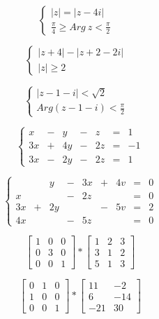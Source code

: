 \documentclass[a4paper]{article}
\begin{document}
\begin{center}
$$\begin{cases}
 \left |  z \right | =  \left |  z-4i \right | & \\ 
 \frac{\pi }{4} \geqslant Arg \ z < \frac{\pi}{2} &  
\end{cases}$$


$$\begin{cases}
 \left |  z+4 \right | -  \left |  z+2-2i \right | & \\ 
 \left | z \right | \geqslant 2 &  
\end{cases}$$

$$\begin{cases}
 \left |  z-1-i \right | < \sqrt{2} & \\ 
 Arg(z-1-i)< \frac{\pi}{2} &  
\end{cases}$$



$$
\left \{
\begin{array}{rrrrrrr}
 x & - & y & - & z &= & 1  \\ 
 3x & + & 4y & - & 2z & = & -1  \\
 3x & - & 2y & - & 2z & = & 1 
\end{array}
\right.
$$


$$
\left \{
\begin{array}{rrrrrrrrr}
 & & y &  - & 3x  & +  & 4v & = & 0 \\ 
 x & & & - & 2z & & & = & 0  \\
 3x & + & 2y & & & -  & 5v & = & 2 \\
  4x & & & - &5z & & & =  &  0    
\end{array}
\right.
$$

$$
\begin{bmatrix}
1 & 0 & 0 \\ 
0 & 3 & 0\\ 
0 & 0 & 1 
\end{bmatrix}
*
\begin{bmatrix}
1 & 2 & 3 \\ 
3 & 1 & 2\\ 
5 & 1 & 3 
\end{bmatrix}
$$


$$
\begin{bmatrix}
0 & 1 & 0 \\ 
1 & 0 & 0\\ 
0 & 0 & 1 
\end{bmatrix}
*
\begin{bmatrix}
11 & -2 \\ 
6 & -14\\ 
-21 & 30 
\end{bmatrix}
$$




\end{center}
\end{document}
